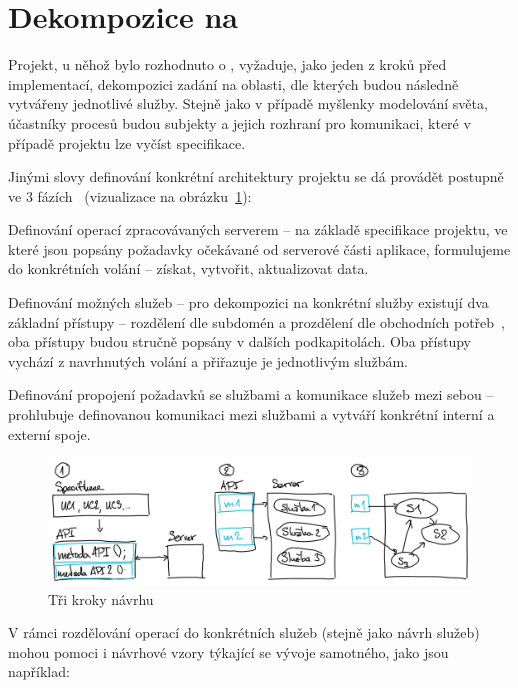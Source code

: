 \section{Dekompozice na }\label{sec:msa-decomposition}

Projekt, u něhož bylo rozhodnuto o , vyžaduje, jako jeden z kroků před implementací, dekompozici zadání na oblasti, dle kterých budou následně vytvářeny jednotlivé služby.
Stejně jako v případě myšlenky modelování světa, účastníky procesů budou subjekty a jejich rozhraní pro komunikaci, které v případě projektu lze vyčíst specifikace.

Jinými slovy definování konkrétní architektury projektu se dá provádět postupně ve 3 fázích~\cite{msachris}  (vizualizace na obrázku~\ref{fig:msa-decomposition-flow}):


\begin{ol}
   \item Definování operací zpracovávaných serverem – na základě specifikace projektu, ve které jsou popsány požadavky očekávané od serverové části aplikace, formulujeme do konkrétních volání – získat, vytvořit, aktualizovat data.
   \item Definování možných služeb – pro dekompozici na konkrétní služby existují dva základní přístupy – rozdělení dle subdomén a prozdělení dle obchodních potřeb~\cite{msachris}, oba přístupy budou stručně popsány v dalších podkapitolách.
   Oba přístupy vychází z navrhnutých volání a přiřazuje je jednotlivým službám.
   \item Definování propojení požadavků se službami a komunikace služeb mezi sebou – prohlubuje definovanou komunikaci mezi službami a vytváří konkrétní interní a externí spoje.
\end{ol}


\begin{figure}[htbp]
   \centering
   \includegraphics[max width=\textwidth]{assets/draft-decomposition-flow}
   \caption{Tři kroky návrhu }\label{fig:msa-decomposition-flow}
\end{figure}


V rámci rozdělování operací do konkrétních služeb (stejně jako návrh služeb) mohou pomoci i návrhové vzory týkající se vývoje samotného, jako jsou například:


